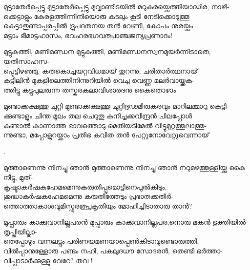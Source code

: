 \begin{enumerate}

\begin{slokam}{\VSr}{\Vyl}{മുട്ടാതേർപ്പെട്ടു}
മുട്ടാതേർപ്പെട്ടു മുവ്വാണ്ടിടയിൽ മറുകരയ്ക്കെത്തിയാദ്ധീര, നാഴി-\\
ക്കെട്ടാളും കേരളത്തിന്നിനിയൊരു കടലും കൂടി നേടിക്കൊടുത്തൂ \\
കെട്ടാതുണ്ടാപ്പരപ്പിൽ ദ്രുപദതനയ തൻ വേണി, കോപം നുരയ്ക്കും\\
മട്ടാം ഭീമാട്ടഹാസം, ഭവഹരഭഗവത്പാഞ്ചജന്യപ്രണാദം!
\end{slokam}


\begin{slokam}{\VKm}{\VKG}{മുട്ടുകുത്തി, മണിമണ്ഡന}
മുട്ടുകുത്തി, മണിമണ്ഡനസ്വനമുയർന്നിടാതെ, യതിസാഹസ-\\
പ്പെട്ടിഴഞ്ഞു, കതകൊച്ചയറ്റവിധമായ്‌ തുറന്നു, ചരിതാർത്ഥനായ്‌\\
കട്ടിലിൻ മുകളിലെത്തിനിന്നുറിയിൽ വെച്ച വെണ്ണ മലർവായ്ക്കക-\\
ത്തിട്ടു കട്ടുപുലരുന്ന തസ്കരകലാവിശാരദനു കൈതൊഴാം
\end{slokam}



\begin{slokam}{\VSr}{\PG}{മുണ്ടാക്കക്ഷത്തു ചുറ്റി}
മുണ്ടാക്കക്ഷത്തു ചുറ്റിദ്ദൃഢമിരുകരവും മാറിലമ്മാറു കെട്ടി-\\
ക്കുണ്ടാളും ചിന്ത മൂലം തല ചെറുതു കുനിച്ചക്കവീന്ദ്രൻ ചിലപ്പോള്‍\\
കണ്ടാൽ കാണാത്ത ഭാവത്തൊടു മെതിയടിമേൽ വീട്ടുമുറ്റത്തുലാത്തു-\\
ന്നുണ്ടാ, മപ്പോളുറയ്ക്കാം പ്രതിഭ കവിത തൻ പേറ്റുനോവേറ്റുവെന്നായ്‌
\end{slokam}


.


\begin{slokam}{\VSv}{\DSN}{മുത്താണെന്നു നിനച്ചു ഞാൻ}
മുത്താണെന്നു നിനച്ചു ഞാൻ നറുമഴത്തുള്ളിയ്ക്കു കൈ നീട്ടു, മുത്-\\
കൃഷ്ടാകർഷകഹേമമെന്നുകരുതിപ്പൂമൊട്ടിനെപുൽകിടും,\\
ശുദ്ധാകർഷകഹേമമെന്നു കരുതിത്തേടും പ്രഭാതക്കതിർ-\\
ത്തൊത്താകാശവുമിസ്ഫുരത്പ്രകൃതിയും മോഹിച്ചിടാതാരു താൻ?
\end{slokam}




\begin{slokam}{\VSr}{\ONN}{മുപ്പാരും കാക്കുവാനില്ലപരൻ}
മുപ്പാരും കാക്കുവാനില്ലപര,നൊരു മകൻ ഭുക്തിയിൽ തൃപ്തിയില്ലാ-\\
തെപ്പോഴും വന്നലട്ടും പരിണയമണയാപ്പെൺകിടാവുണ്ടൊരുത്തി,\\
വിൽപ്പാനുള്ളോരു പണ്ടം നഹി, പകലുദധൗ സോദരൻ, തെണ്ടി ഭർത്താ-\\
വിപ്പാടാർക്കുള്ളു വേറേ? തവ !
\end{slokam}


\end{enumerate}
